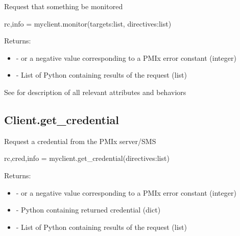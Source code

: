 \summary

Request that something be monitored

\format

\pyspecificstart
\begin{codepar}
rc,info = myclient.monitor(targets:list, directives:list)
\end{codepar}
\pyspecificend

\begin{arglist}
\end{arglist}

Returns:

\begin{itemize}
    \item {} -  or a negative value corresponding to a PMIx error constant (integer)
    \item {} - List of Python  containing results of the request (list)
\end{itemize}


See  for description of all relevant attributes and behaviors


\subsection{Client.get_credential}

\summary

Request a credential from the PMIx server/SMS

\format

\pyspecificstart
\begin{codepar}
rc,cred,info = myclient.get_credential(directives:list)
\end{codepar}
\pyspecificend

\begin{arglist}
\end{arglist}

Returns:

\begin{itemize}
    \item {} -  or a negative value corresponding to a PMIx error constant (integer)
    \item {} - Python  containing returned credential (dict)
    \item {} - List of Python  containing results of the request (list)
\end{itemize}



